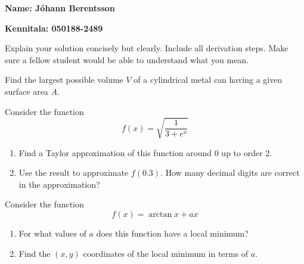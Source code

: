 \documentclass[answers,a4paper,11pt]{exam}
\begin{document}
\noindent
\textbf{Name: Jóhann Berentsson} %

\vspace{0.5em}
\noindent
\textbf{Kennitala: 050188-2489} %

\vspace{0.5em}
\noindent
Explain your solution concisely but clearly. Include all derivation steps. Make sure a fellow student would be able to understand what you mean.

\begin{questions}

\question
Find the largest possible volume $V$ of a cylindrical metal can having a given surface area $A$.
    
\begin{solutionbox}{}

\end{solutionbox}
    
\newpage

\question
Consider the function
\[
f(x) = \sqrt{\frac{1}{3+e^x}}
\]
\begin{enumerate}
\item Find a Taylor approximation of this function around 0 up to order 2.
\item Use the result to approximate $f(0.3)$. How many decimal digits are correct in the approximation?
\end{enumerate}

\begin{solutionbox}{}

\end{solutionbox}

\newpage

\question
Consider the function
\[
f(x) = \arctan x + a x
\]
\begin{enumerate}
\item For what values of $a$ does this function have a local minimum?
\item Find the $(x,y)$ coordinates of the local minimum in terms of $a$.
\end{enumerate}

\begin{solutionbox}{}

\end{solutionbox}

\end{questions}        
\end{document}
